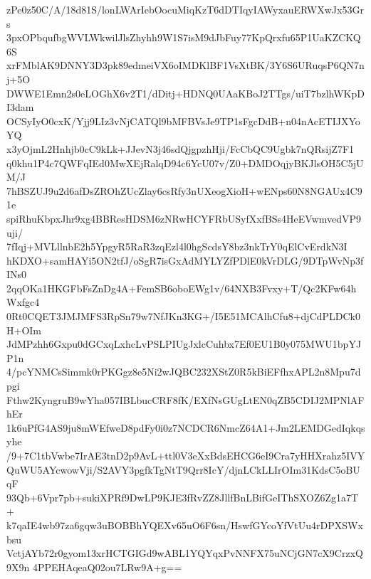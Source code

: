 zPe0z50C/A/18d81S/lonLWArIebOocuMiqKzT6dDTIqyIAWyxauERWXwJx53Grs
3pxOPbqufbgWVLWkwilJlsZhyhh9W1S7isM9dJbFuy77KpQrxfu65P1UaKZCKQ6S
xrFMblAK9DNNY3D3pk89edmeiVX6oIMDKlBF1VsXtBK/3Y6S6URuqsP6QN7nj+5O
DWWE1Emn2s0eLOGhX6v2T1/dDitj+HDNQ0UAaKBoJ2TTgs/uiT7bzlhWKpDI3dam
OCSyIyO0cxK/Yjj9LIz3vNjCATQl9bMFBVsJe9TP1sFgcDdB+n04nAcETIJXYoYQ
x3yOjmL2Hnhjb0cC9kLk+JJevN3j46sdQjgpzhHji/FcCbQC9Ugbk7nQRsijZ7F1
q0khu1P4c7QWFqIEd0MwXEjRalqD94c6YcU07v/Z0+DMDOqjyBKJlsOH5C5jUM/J
7hBSZUJ9u2d6afDsZROhZUcZlay6csRfy3nUXeogXioH+wENps60N8NGAUx4C91e
spiRhuKbpxJhr9xg4BBResHDSM6zNRwHCYFRbUSyfXxfBSs4HeEVwmvedVP9uji/
7fIqj+MVLllnbE2h5YpgyR5RaR3zqEzl4l0hgScdsY8bz3nkTrY0qElCvErdkN3I
hKDXO+samHAYi5ON2tfJ/oSgR7isGxAdMYLYZfPDlE0kVrDLG/9DTpWvNp3fINs0
2qqOKa1HKGFbFsZnDg4A+FemSB6oboEWg1v/64NXB3Fvxy+T/Qc2KFw64hWxfgc4
0Rt0CQET3JMJMFS3RpSn79w7NfJKn3KG+/I5E51MCAlhCfu8+djCdPLDCk0H+OIm
JdMPzhh6Gxpu0dGCxqLxhcLvPSLPIUgJxlcCuhbx7Ef0EU1B0y075MWU1bpYJP1n
4/pcYNMCsSimmk0rPKGgz8e5Ni2wJQBC232XStZ0R5kBiEFfhxAPL2n8Mpu7dpgi
Fthw2KyngruB9wYha057IBLbucCRF8fK/EXfNsGUgLtEN0qZB5CDIJ2MPNlAFhEr
1k6uPfG4AS9ju8mWEfweD8pdFy0i0z7NCDCR6NmcZ64A1+Jm2LEMDGedIqkqsyhe
/9+7C1tbVwbe7IrAE3tnD2p9AvL+ttl0V3eXxBdsEHCG6eI9Cra7yHHXrahz5IVY
QuWU5AYcwowVji/S2AVY3pgfkTgNtT9Qrr8IcY/djnLCkLLIrOIm31KdsC5oBUqF
93Qb+6Vpr7pb+sukiXPRf9DwLP9KJE3fRvZZ8JllfBnLBifGeIThSXOZ6Zg1a7T+
k7qaIE4wb97za6gqw3uBOBBhYQEXv65uO6F6sn/HswfGYcoYfVtUu4rDPXSWxbsu
VctjAYb72r0gyom13xrHCTGIGd9wABL1YQYqxPvNNFX75uNCjGN7cX9CrzxQ9X9n
4PPEHAqeaQ02ou7LRw9A+g==

